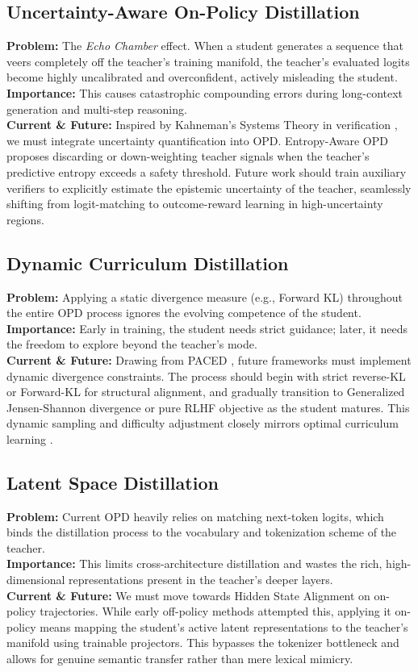 \subsection{Uncertainty-Aware On-Policy Distillation}
\textbf{Problem:} The \textit{Echo Chamber} effect. When a student generates a sequence that veers completely off the teacher's training manifold, the teacher's evaluated logits become highly uncalibrated and overconfident, actively misleading the student. \\
\textbf{Importance:} This causes catastrophic compounding errors during long-context generation and multi-step reasoning. \\
\textbf{Current \& Future:} Inspired by Kahneman's Systems Theory in verification \citep{arxiv_2502_11157}, we must integrate uncertainty quantification into OPD. Entropy-Aware OPD \citep{arxiv_2603_07079} proposes discarding or down-weighting teacher signals when the teacher's predictive entropy exceeds a safety threshold. Future work should train auxiliary verifiers to explicitly estimate the epistemic uncertainty of the teacher, seamlessly shifting from logit-matching to outcome-reward learning in high-uncertainty regions.

\subsection{Dynamic Curriculum Distillation}
\textbf{Problem:} Applying a static divergence measure (e.g., Forward KL) throughout the entire OPD process ignores the evolving competence of the student. \\
\textbf{Importance:} Early in training, the student needs strict guidance; later, it needs the freedom to explore beyond the teacher's mode. \\
\textbf{Current \& Future:} Drawing from PACED \citep{arxiv_2603_11178}, future frameworks must implement dynamic divergence constraints. The process should begin with strict reverse-KL or Forward-KL for structural alignment, and gradually transition to Generalized Jensen-Shannon divergence or pure RLHF objective as the student matures. This dynamic sampling and difficulty adjustment closely mirrors optimal curriculum learning \citep{arxiv_2403_02241}.

\subsection{Latent Space Distillation}
\textbf{Problem:} Current OPD heavily relies on matching next-token logits, which binds the distillation process to the vocabulary and tokenization scheme of the teacher. \\
\textbf{Importance:} This limits cross-architecture distillation and wastes the rich, high-dimensional representations present in the teacher's deeper layers. \\
\textbf{Current \& Future:} We must move towards Hidden State Alignment on on-policy trajectories. While early off-policy methods attempted this, applying it on-policy means mapping the student's active latent representations to the teacher's manifold using trainable projectors. This bypasses the tokenizer bottleneck and allows for genuine semantic transfer rather than mere lexical mimicry.


